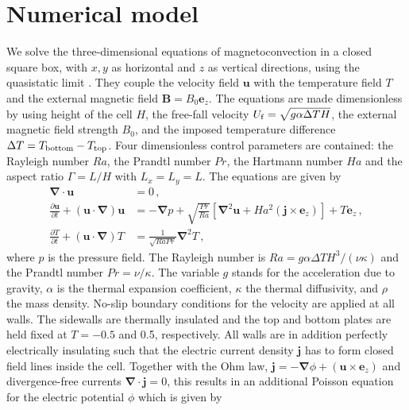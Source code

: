 \documentclass{jfm}
\begin{document}
\section{Numerical model}\label{sec:method}
We solve the three-dimensional equations of magnetoconvection in a closed square box,
with $x,y$ as horizontal and $z$ as vertical directions, using the quasistatic limit \citep{Zuerner2016}. 
They couple the velocity field ${\bm u}$ with the temperature field $T$ and the external magnetic field ${\bm B}=B_0{\bm e}_z$.
The equations are made dimensionless by using height of the cell $H$, the free-fall velocity $U_{\rm f}=\sqrt{g \alpha \Delta T H}$,
the external magnetic field strength $B_0$, and the imposed temperature difference $\Delta T=T_{\rm bottom}-T_{\rm top}$. Four dimensionless
control parameters are contained: the Rayleigh number $Ra$, the Prandtl number $Pr$, the Hartmann number $Ha$ and the aspect ratio
$\Gamma = L/H$ with $L_x = L_y = L$. The equations are given by
\begin{align}
\label{ceq}
{\bm \nabla}\cdot {\bm u}&=0\,,\\
\label{nseq}
\frac{\partial  \bm u}{\partial  t}+(\bm u \cdot \bm \nabla){\bm u}
&=-\bm\nabla p+\sqrt{\frac{Pr}{Ra}} \left[\bm\nabla^2 \bm u+Ha^2 (\bm j\times \bm e_z)\right] + T \bm e_z\,,\\
\frac{\partial  T}{\partial  t}+(\bm u \cdot \bm \nabla) T
&=\frac{1}{\sqrt{Ra Pr}} \bm\nabla^2 T\,,
\label{pseq}
\end{align}
where $p$ is the pressure field. The Rayleigh number is $Ra=g\alpha\Delta T H^3/(\nu\kappa)$ and the Prandtl number $Pr=\nu/\kappa$.
The variable $g$ stands for the  acceleration due to gravity, $\alpha$ is the thermal expansion coefficient,
$\kappa$ the thermal diffusivity, and $\rho$ the mass density. No-slip boundary conditions for the velocity 
are applied at all walls. The sidewalls are thermally insulated and the top and bottom plates are held fixed at
$T=-0.5$ and 0.5, respectively. All walls are in addition perfectly electrically insulating such that the electric
current density ${\bm j}$ has to form closed field lines inside the cell. Together with the Ohm law,
${\bm j}=-\bm \nabla \phi + (\bm u\times \bm e_z)$ and divergence-free currents ${\bm \nabla}\cdot {\bm j}=0$,
this results in an additional Poisson equation for the electric potential $\phi$ which is given by
\end{document}
